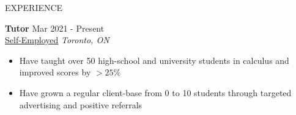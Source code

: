\documentclass{resume}
\begin{document}
\begin{rSection}{EXPERIENCE}

 

\textbf{Tutor} \hfill Mar 2021 - Present \\
\href{https://www.overleaf.com/read/qybvrsfbsbwq}{Self-Employed} \hfill \textit{Toronto, ON} 
\vspace{-0.2cm}
\begin{itemize}
   \itemsep -8pt {} 
   \item Have taught over 50 high-school and university students in calculus and improved scores by $ >25\%$ 
   \item Have grown a regular client-base from 0 to 10 students through targeted advertising and positive referrals
\end{itemize}
\end{rSection} 
\end{document}
